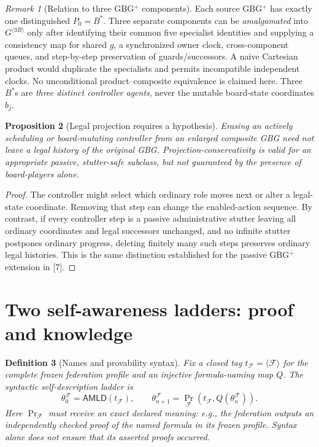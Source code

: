 \documentclass[10pt,letterpaper]{article}
\newtheorem{definition}{Definition}[section]
\newtheorem{proposition}[definition]{Proposition}
\theoremstyle{remark}\newtheorem{remark}[definition]{Remark}
\newcommand{\AMLD}{\mathsf{AMLD}}
\newcommand{\F}{\mathcal{F}}
\newcommand{\Prf}{\operatorname{Pr}}
\begin{document}
\begin{remark}[Relation to three GBG$^+$ components]
Each source GBG$^+$ has exactly one distinguished $P_0=B^*$. Three separate components can be \emph{amalgamated} into $G^{\langle3B\rangle}$ only after identifying their common five specialist identities and supplying a consistency map for shared $g$, a synchronized owner clock, cross-component queues, and step-by-step preservation of guards/successors. A naive Cartesian product would duplicate the specialists and permits incompatible independent clocks. No unconditional product--composite equivalence is claimed here. Three $B^*$s are \emph{three distinct controller agents}, never the mutable board-state coordinates $b_j$.
\end{remark}

\begin{proposition}[Legal projection requires a hypothesis]
Erasing an actively scheduling or board-mutating controller from an enlarged composite GBG need not leave a legal history of the original GBG. Projection-conservativity is valid for an appropriate passive, stutter-safe subclass, but not guaranteed by the presence of board-players alone.
\end{proposition}
\begin{proof}
The controller might select which ordinary role moves next or alter a legal-state coordinate. Removing that step can change the enabled-action sequence. By contrast, if every controller step is a passive administrative stutter leaving all ordinary coordinates and legal successors unchanged, and no infinite stutter postpones ordinary progress, deleting finitely many such steps preserves ordinary legal histories. This is the same distinction established for the passive GBG$^+$ extension in [7].
\end{proof}

\section{Two self-awareness ladders: proof and knowledge}
\begin{definition}[Names and provability syntax]
Fix a closed tag $t_{\F}=\langle\F\rangle$ for the complete frozen federation profile and an injective formula-naming map $Q$. The syntactic self-description ladder is
\[
\theta_0^{\F}=\AMLD(t_{\F}),\qquad
\theta_{n+1}^{\F}=\Prf_{\F}(t_{\F},Q(\theta_n^{\F})).
\]
Here $\Prf_{\F}$ must receive an exact declared meaning: e.g., the federation outputs an independently checked proof of the named formula in its frozen profile. Syntax alone does not ensure that its asserted proofs occurred.
\end{definition}
\end{document}
